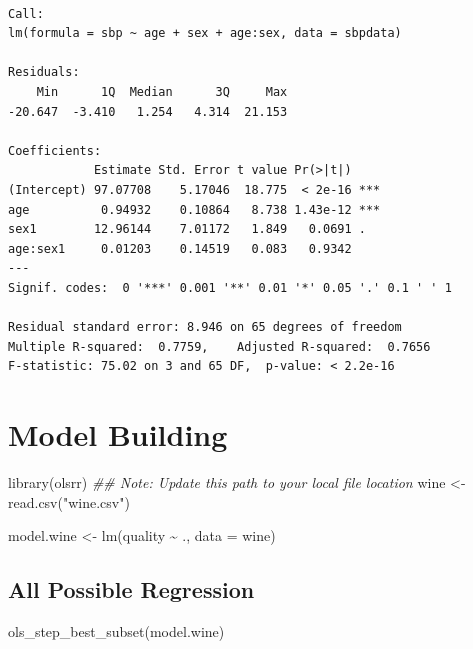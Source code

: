 \documentclass[
  letterpaper,
]{scrbook}
\newenvironment{Shaded}{\begin{snugshade}}{\end{snugshade}}
\newcommand{\AttributeTok}[1]{\textcolor[rgb]{0.40,0.45,0.13}{#1}}
\newcommand{\DocumentationTok}[1]{\textcolor[rgb]{0.37,0.37,0.37}{\textit{#1}}}
\newcommand{\FunctionTok}[1]{\textcolor[rgb]{0.28,0.35,0.67}{#1}}
\newcommand{\NormalTok}[1]{\textcolor[rgb]{0.00,0.23,0.31}{#1}}
\newcommand{\OtherTok}[1]{\textcolor[rgb]{0.00,0.23,0.31}{#1}}
\newcommand{\SpecialCharTok}[1]{\textcolor[rgb]{0.37,0.37,0.37}{#1}}
\newcommand{\StringTok}[1]{\textcolor[rgb]{0.13,0.47,0.30}{#1}}
\begin{document}
\begin{verbatim}

Call:
lm(formula = sbp ~ age + sex + age:sex, data = sbpdata)

Residuals:
    Min      1Q  Median      3Q     Max 
-20.647  -3.410   1.254   4.314  21.153 

Coefficients:
            Estimate Std. Error t value Pr(>|t|)    
(Intercept) 97.07708    5.17046  18.775  < 2e-16 ***
age          0.94932    0.10864   8.738 1.43e-12 ***
sex1        12.96144    7.01172   1.849   0.0691 .  
age:sex1     0.01203    0.14519   0.083   0.9342    
---
Signif. codes:  0 '***' 0.001 '**' 0.01 '*' 0.05 '.' 0.1 ' ' 1

Residual standard error: 8.946 on 65 degrees of freedom
Multiple R-squared:  0.7759,    Adjusted R-squared:  0.7656 
F-statistic: 75.02 on 3 and 65 DF,  p-value: < 2.2e-16
\end{verbatim}

\section{Model Building}\label{model-building}

\begin{Shaded}
\begin{Highlighting}[]
\FunctionTok{library}\NormalTok{(olsrr)}
\DocumentationTok{\#\# Note: Update this path to your local file location}
\NormalTok{wine }\OtherTok{\textless{}{-}} \FunctionTok{read.csv}\NormalTok{(}\StringTok{"wine.csv"}\NormalTok{)}

\NormalTok{model.wine }\OtherTok{\textless{}{-}} \FunctionTok{lm}\NormalTok{(quality }\SpecialCharTok{\textasciitilde{}}\NormalTok{ ., }\AttributeTok{data =}\NormalTok{ wine)}
\end{Highlighting}
\end{Shaded}

\subsection{All Possible Regression}\label{all-possible-regression}

\begin{Shaded}
\begin{Highlighting}[]
\FunctionTok{ols\_step\_best\_subset}\NormalTok{(model.wine)}
\end{Highlighting}
\end{Shaded}
\end{document}
